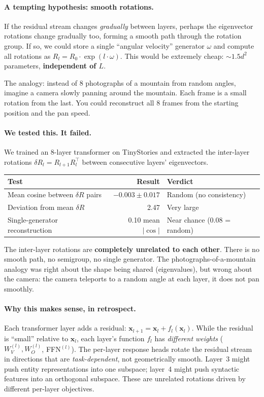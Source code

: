 \documentclass[11pt, a4paper]{article}
\newcommand{\x}{\mathbf{x}}
\theoremstyle{remark}
\begin{document}
\paragraph{A tempting hypothesis: smooth rotations.}
If the residual stream changes \emph{gradually} between layers, perhaps the eigenvector rotations change gradually too, forming a smooth path through the rotation group.
If so, we could store a single ``angular velocity'' generator $\omega$ and compute all rotations as $R_l = R_0 \cdot \exp(l \cdot \omega)$.
This would be extremely cheap: $\sim 1.5d^2$ parameters, \textbf{independent of $L$}.

The analogy: instead of 8 photographs of a mountain from random angles, imagine a camera slowly panning around the mountain.
Each frame is a small rotation from the last.
You could reconstruct all 8 frames from the starting position and the pan speed.

\paragraph{We tested this. It failed.}
We trained an 8-layer transformer on TinyStories and extracted the inter-layer rotations $\delta R_l = R_{l+1} R_l^\top$ between consecutive layers' eigenvectors.

\begin{center}\small
\renewcommand{\arraystretch}{1.2}
\begin{tabular}{@{}lrl@{}}
\toprule
\textbf{Test} & \textbf{Result} & \textbf{Verdict} \\
\midrule
Mean cosine between $\delta R$ pairs & $-0.003 \pm 0.017$ & Random (no consistency) \\
Deviation from mean $\delta R$ & 2.47 & Very large \\
Single-generator reconstruction & 0.10 mean $|\cos|$ & Near chance (0.08 = random) \\
\bottomrule
\end{tabular}
\end{center}

\noindent
The inter-layer rotations are \textbf{completely unrelated to each other}.
There is no smooth path, no semigroup, no single generator.
The photographs-of-a-mountain analogy was right about the shape being shared (eigenvalues), but wrong about the camera: the camera teleports to a random angle at each layer, it does not pan smoothly.

\paragraph{Why this makes sense, in retrospect.}
Each transformer layer adds a residual: $\x_{l+1} = \x_l + f_l(\x_l)$.
While the residual is ``small'' relative to $\x_l$, each layer's function $f_l$ has \emph{different weights} ($W_V^{(l)}, W_O^{(l)}$, FFN$^{(l)}$).
The per-layer response heads rotate the residual stream in directions that are \emph{task-dependent}, not geometrically smooth.
Layer~3 might push entity representations into one subspace; layer~4 might push syntactic features into an orthogonal subspace.
These are unrelated rotations driven by different per-layer objectives.
\end{document}
